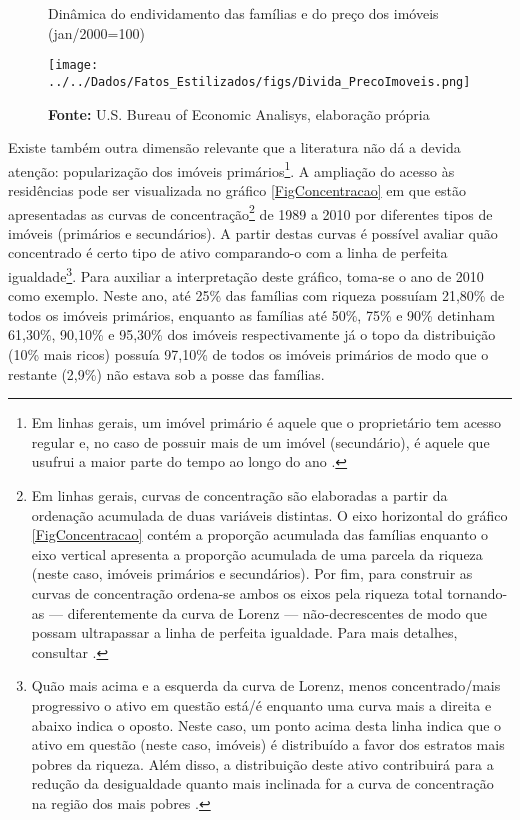 \begin{figure}[H]
	\centering
	\caption{Dinâmica do endividamento das famílias e do preço dos imóveis (jan/2000=100)}
	\label{FigDividaPreco}
	\texttt{[image: ../../Dados/Fatos\_Estilizados/figs/Divida\_PrecoImoveis.png]}
	\caption*{\textbf{Fonte:} U.S. Bureau of Economic Analisys, elaboração própria}
\end{figure}



Existe também outra dimensão relevante que a literatura não dá a devida atenção: popularização dos imóveis primários\footnote{
	Em linhas gerais, um imóvel primário é aquele que o proprietário tem acesso regular e, no caso de possuir mais de um imóvel (secundário), é aquele que usufrui a maior parte do tempo ao longo do ano \cite{us_census_bureau_characteristics_2017}.
}.
A ampliação do acesso às residências pode ser visualizada no gráfico \ref{FigConcentracao} em que estão apresentadas as curvas de concentração\footnote{
	Em linhas gerais, curvas de concentração são elaboradas a partir da ordenação acumulada de duas variáveis distintas. O eixo horizontal do gráfico \ref{FigConcentracao} contém a proporção acumulada das famílias enquanto o eixo vertical apresenta a proporção acumulada de uma parcela da riqueza (neste caso, imóveis primários e secundários). Por fim, para construir as curvas de concentração ordena-se ambos os eixos pela riqueza total tornando-as --- diferentemente da curva de Lorenz --- não-decrescentes de modo que possam ultrapassar a linha de perfeita igualdade. Para mais detalhes, consultar \textcite[p.~197--201]{hoffmann_distribuicao_2018}.
} de 1989 a 2010 por diferentes tipos de imóveis (primários e secundários).
A partir destas curvas é possível avaliar quão concentrado é certo tipo de ativo comparando-o com a linha de perfeita igualdade\footnote{Quão mais acima e a esquerda da curva de Lorenz, menos concentrado/mais progressivo o ativo em questão está/é enquanto uma curva mais a direita e abaixo indica o oposto.
Neste caso, um ponto acima desta linha indica que o ativo em questão (neste caso, imóveis) é distribuído a favor dos estratos mais pobres da riqueza.
Além disso, a distribuição deste ativo contribuirá para a redução da desigualdade quanto mais inclinada for a curva de concentração na região dos mais pobres \cite[p.~36]{medeiros_uma_2006}.
}.
Para auxiliar a interpretação deste gráfico, toma-se o ano de 2010 como exemplo.
Neste ano, até 25\% das famílias com riqueza possuíam 21,80\% de todos os imóveis primários, enquanto as famílias até 50\%, 75\% e 90\% detinham 61,30\%, 90,10\% e 95,30\% dos imóveis respectivamente já o topo da distribuição (10\% mais ricos) possuía 97,10\% de todos os imóveis primários de modo que o restante (2,9\%) não estava sob a posse das famílias.

